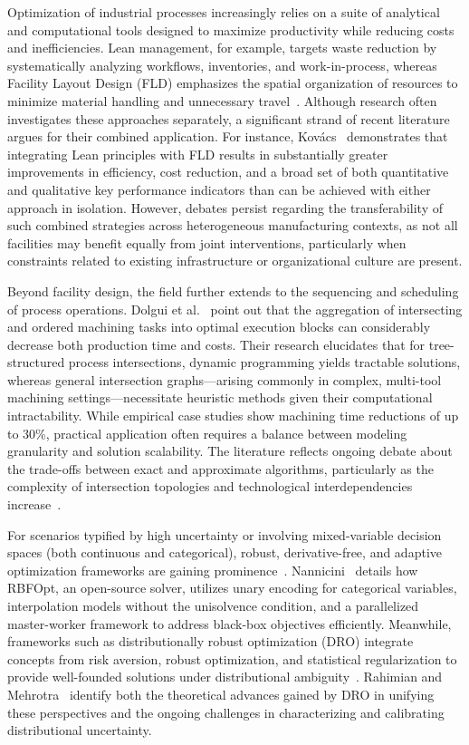 \documentclass[sigconf]{acmart}
\begin{document}
Optimization of industrial processes increasingly relies on a suite of analytical and computational tools designed to maximize productivity while reducing costs and inefficiencies. Lean management, for example, targets waste reduction by systematically analyzing workflows, inventories, and work-in-process, whereas Facility Layout Design (FLD) emphasizes the spatial organization of resources to minimize material handling and unnecessary travel~\cite{ref81}. Although research often investigates these approaches separately, a significant strand of recent literature argues for their combined application. For instance, Kovács~\cite{ref81} demonstrates that integrating Lean principles with FLD results in substantially greater improvements in efficiency, cost reduction, and a broad set of both quantitative and qualitative key performance indicators than can be achieved with either approach in isolation. However, debates persist regarding the transferability of such combined strategies across heterogeneous manufacturing contexts, as not all facilities may benefit equally from joint interventions, particularly when constraints related to existing infrastructure or organizational culture are present.

Beyond facility design, the field further extends to the sequencing and scheduling of process operations. Dolgui et al.~\cite{ref82} point out that the aggregation of intersecting and ordered machining tasks into optimal execution blocks can considerably decrease both production time and costs. Their research elucidates that for tree-structured process intersections, dynamic programming yields tractable solutions, whereas general intersection graphs—arising commonly in complex, multi-tool machining settings—necessitate heuristic methods given their computational intractability. While empirical case studies show machining time reductions of up to 30\%, practical application often requires a balance between modeling granularity and solution scalability. The literature reflects ongoing debate about the trade-offs between exact and approximate algorithms, particularly as the complexity of intersection topologies and technological interdependencies increase~\cite{ref82}.

For scenarios typified by high uncertainty or involving mixed-variable decision spaces (both continuous and categorical), robust, derivative-free, and adaptive optimization frameworks are gaining prominence~\cite{ref77,ref78}. Nannicini~\cite{ref76} details how RBFOpt, an open-source solver, utilizes unary encoding for categorical variables, interpolation models without the unisolvence condition, and a parallelized master-worker framework to address black-box objectives efficiently. Meanwhile, frameworks such as distributionally robust optimization (DRO) integrate concepts from risk aversion, robust optimization, and statistical regularization to provide well-founded solutions under distributional ambiguity~\cite{ref77}. Rahimian and Mehrotra~\cite{ref77} identify both the theoretical advances gained by DRO in unifying these perspectives and the ongoing challenges in characterizing and calibrating distributional uncertainty.
\end{document}
